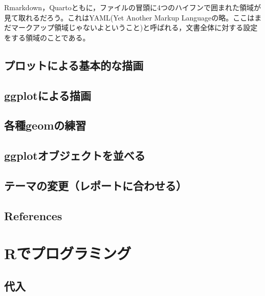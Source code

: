\documentclass[
  a4paper,
]{ltjsbook}
\begin{document}
Rmarkdown，Quartoともに，ファイルの冒頭に4つのハイフンで囲まれた領域が見て取れるだろう。これはYAML(Yet
Another Markup
Languageの略。ここはまだマークアップ領域じゃないよということ)と呼ばれる，文書全体に対する設定をする領域のことである。

\section{プロットによる基本的な描画}\label{ux30d7ux30edux30c3ux30c8ux306bux3088ux308bux57faux672cux7684ux306aux63cfux753b}

\section{ggplotによる描画}\label{ggplotux306bux3088ux308bux63cfux753b}

\section{各種geomの練習}\label{ux5404ux7a2egeomux306eux7df4ux7fd2}

\section{ggplotオブジェクトを並べる}\label{ggplotux30aaux30d6ux30b8ux30a7ux30afux30c8ux3092ux4e26ux3079ux308b}

\section{テーマの変更（レポートに合わせる）}\label{ux30c6ux30fcux30deux306eux5909ux66f4ux30ecux30ddux30fcux30c8ux306bux5408ux308fux305bux308b}

\section{References}\label{references-3}



\chapter{Rでプログラミング}\label{rux3067ux30d7ux30edux30b0ux30e9ux30dfux30f3ux30b0}

\section{代入}\label{ux4ee3ux5165}
\end{document}
